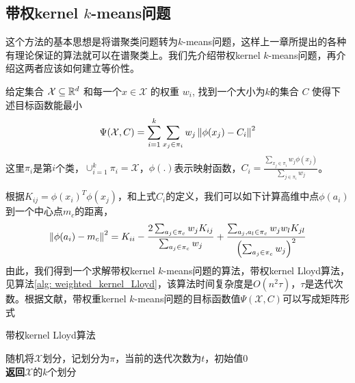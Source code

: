 \subsection{带权kernel \texorpdfstring{$k$}{k}-means问题}
这个方法的基本思想是将谱聚类问题转为$k$-means问题，这样上一章所提出的各种有理论保证的算法就可以在谱聚类上。我们先介绍带权kernel $k$-means问题，再介绍这两者应该如何建立等价性。
\begin{definition}
    \label{def: weighted_kernel_kmeans}
    给定集合 $\mathcal{X} \subseteq \mathbb{R}^d$ 和每一个$x \in \mathcal{X}$ 的权重 $w_i$, 找到一个大小为$k$的集合 $C$ 使得下述目标函数能最小
    \begin{equation}
        \Psi(\mathcal{X},C) = \sum_{i=1}^k \sum_{x_j \in \pi_i}w_j \left\lVert\phi(x_j)-C_i\right\rVert^2
    \end{equation}
    这里$\pi_i$是第$i$个类，$\cup_{i=1}^k \pi_i = \mathcal{X}$，$\phi(.)$表示映射函数，$C_i = \frac{\sum_{x_j \in \pi_i}w_j \phi(x_j)}{\sum_{j \in \pi_i}w_j}$。
\end{definition}
根据$K_{ij} = \phi(x_i)^T\phi(x_j)$，和上式$C_i$的定义，我们可以如下计算高维中点$\phi(a_i)$到一个中心点$m_c$的距离，
\begin{equation}
	\left\lVert\phi(a_i) - m_c\right\rVert^2 = K_{i i}-\frac{2 \sum_{a_{j} \in \pi_{c}} w_{j} K_{i j}}{\sum_{a_{j} \in \pi_{c}} w_{j}}+\frac{\sum_{a_{j}, a_{l} \in \pi_{c}} w_{j} w_{l} K_{j l}}{\left(\sum_{a_{j} \in \pi_{c}} w_{j}\right)^{2}}
\end{equation}
由此，我们得到一个求解带权kernel $k$-means问题的算法，带权kernel Lloyd算法，见算法\ref{alg: weighted_kernel_Lloyd}，该算法时间复杂度是$O(n^2 \tau)$，$\tau$是迭代次数。根据文献\cite{dhillon2004unified}，带权重kernel $k$-means问题的目标函数值$\Psi(\mathcal{X},C)$可以写成矩阵形式
\begin{algorithm}
    \caption{带权kernel Lloyd算法}\label{alg: weighted_kernel_Lloyd}
    随机将$\mathcal{X}$划分，记划分为$\pi$，当前的迭代次数为$t$，初始值0\\
    \textbf{返回}$\mathcal{X}$的$k$个划分
\end{algorithm}

